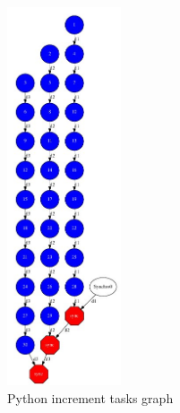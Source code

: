 \begin{figure}[ht!]
  \centering
    \includegraphics[width=0.3\textwidth]{./Sections/3_Python/Figures/increment_graph.jpeg}
    \caption{Python increment tasks graph} 
    \label{fig:increment_python}
\end{figure}

\newpage



